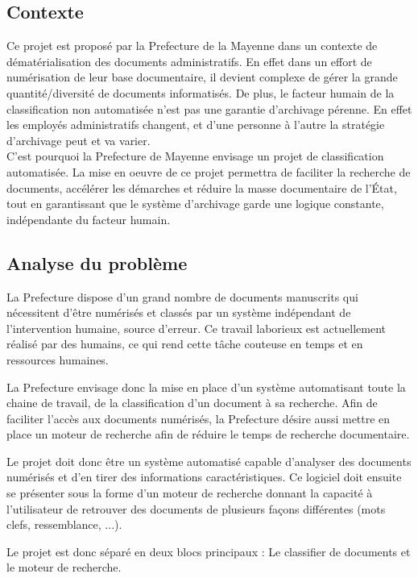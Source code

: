 

\subsection {Contexte}

Ce projet est proposé par la Prefecture de la Mayenne dans un contexte de dématérialisation des documents administratifs.
En effet dans un effort de numérisation de leur base documentaire, il devient complexe de gérer la grande quantité/diversité de documents informatisés. 
De plus, le facteur humain de la classification non automatisée n'est pas une garantie d'archivage pérenne.
En effet les employés administratifs changent, et d'une personne à l'autre la stratégie d'archivage peut et va varier. \\

C'est pourquoi la Prefecture de Mayenne envisage un projet de classification automatisée.
La mise en oeuvre de ce projet permettra de faciliter la recherche de documents, accélérer les démarches et réduire la masse documentaire de l'État, tout en garantissant que le système d'archivage garde une logique constante, indépendante du facteur humain.


\subsection {Analyse du problème}
La Prefecture dispose d'un grand nombre de documents manuscrits qui nécessitent d'être numérisés et classés par un système indépendant de l'intervention humaine, source d'erreur.
Ce travail laborieux est actuellement réalisé par des humains, ce qui rend cette tâche couteuse en temps et en ressources humaines.

La Prefecture envisage donc la mise en place d'un système automatisant toute la chaine de travail, de la classification d'un document à sa recherche.
Afin de faciliter l'accès aux documents numérisés, la Prefecture désire aussi mettre en place un moteur de recherche afin de réduire le temps de recherche documentaire.


Le projet doit donc être un système automatisé capable d'analyser des documents numérisés et d'en tirer des informations caractéristiques.
Ce logiciel doit ensuite se présenter sous la forme d'un moteur de recherche donnant la capacité à l'utilisateur de retrouver des documents de plusieurs façons différentes (mots clefs, ressemblance, ...).


Le projet est donc séparé en deux blocs principaux :
Le classifier de documents et le moteur de recherche.


